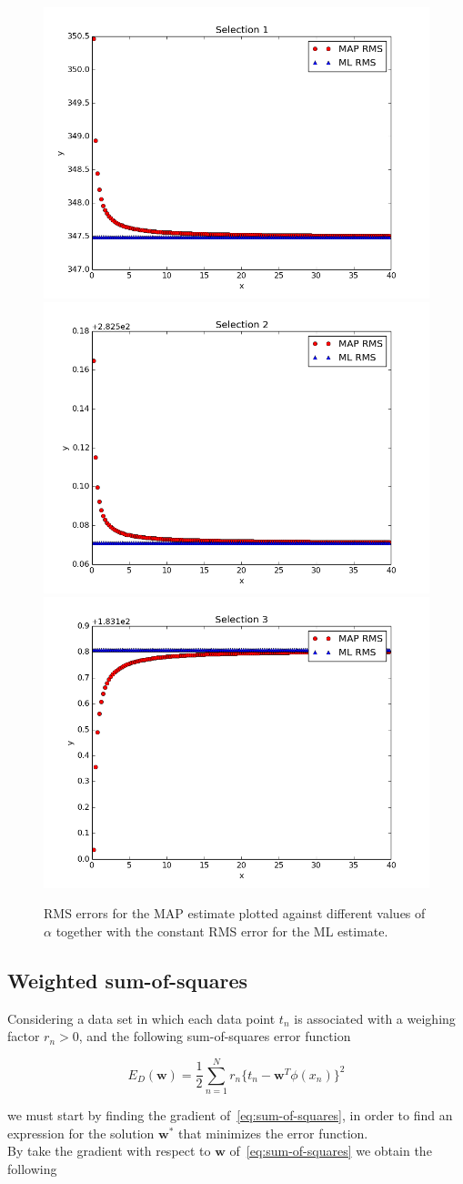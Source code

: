 \documentclass[a4paper]{article}
\begin{document}
\begin{figure}[H]
  \begin{adjustwidth}{-7em}{-7em}
    \centering
    \includegraphics[width=.32\linewidth]{figures/alpha_vs_rms_selection1.png}
    \includegraphics[width=.32\linewidth]{figures/alpha_vs_rms_selection2.png}
    \includegraphics[width=.32\linewidth]{figures/alpha_vs_rms_selection3.png}
  \end{adjustwidth}
  \caption{RMS errors for the MAP estimate plotted against different values of $\alpha$ together with the constant RMS error for the ML estimate.}
  \label{fig:alpha_vs_rms}
\end{figure}

\subsection{Weighted sum-of-squares}
Considering a data set in which each data point $t_n$ is associated with a weighing factor $r_n > 0$, and the following sum-of-squares error function

\begin{equation} \label{eq:sum-of-squares}
E_D(\textbf{w}) = \frac{1}{2} \sum_{n=1}^{N} r_n \big\{ t_n - \textbf{w}^T \phi(x_n) \big\}^2
\end{equation}

we must start by finding the gradient of~\eqref{eq:sum-of-squares}, in order to find an expression for the solution $\textbf{w}^*$ that minimizes the error function.\\
By take the gradient with respect to $\textbf{w}$ of~\eqref{eq:sum-of-squares} we obtain the following
\end{document}
